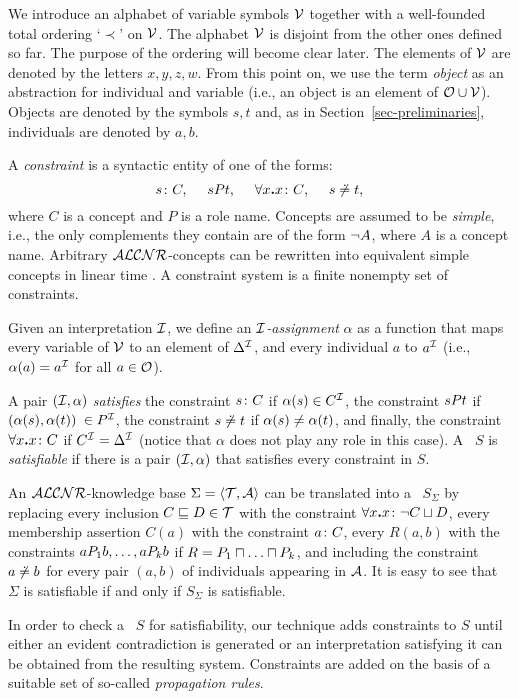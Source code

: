 We introduce an alphabet of variable symbols ${\cal V}$ together
with a well-founded total ordering `$\prec$' on ${\cal V}$.
The alphabet ${\cal V}$ is disjoint from the other ones defined so far.
The purpose of the ordering will become clear later.
The elements of ${\cal V}$ are denoted by the letters
$x,y,z,w$. From this point on, we use the 
term {\em object} as an abstraction for
individual and variable (i.e.,  an object is an element of ${\cal O} \cup {\cal V}$). 
Objects are denoted by the symbols $s,t$ and, as in Section~\ref{sec-preliminaries},
individuals are denoted by $a,b$.

A {\em constraint} is a syntactic entity of one of the 
forms:
	$$s\colon C,~~~~ sPt,~~~~ \forall x\mbox{\bf .}{x\colon C},~~~~ {s \not\doteq t},$$
\noindent
where $C$ is a concept and $P$ is a role name.
Concepts are assumed to be {\em simple}, 
i.e., the only complements they  contain are
of the form $\neg A$, where $A$ is a concept name. Arbitrary 
${\cal ALCNR}$-concepts can be rewritten into equivalent simple
concepts in linear time \cite{DLNN91}.
A constraint system is a finite nonempty set of constraints. 

Given an interpretation ${\cal I}$, we define an 
{\em ${\cal I}$-assignment} $\alpha$ as a function that maps every variable 
of ${\cal V}$ to an element of $\Delta^{\cal I}$, and every 
individual $a$ to $a^{\cal I}$ (i.e., $\alpha(a) = a^{\cal I}$ for all $a \in {\cal O}$).

A pair $({\cal I},\alpha)$ {\em satisfies} the constraint $s\colon C$  
if $\alpha(s) \in C^{\cal I}$, the constraint $sPt$  if 
$(\alpha(s), \alpha(t))$ $\in P^{\cal I}$, the constraint ${s \not\doteq t}$
if $\alpha(s)\neq \alpha(t)$, and finally, the constraint $\forall x\mbox{\bf .}{x\colon C}$ if $C^{\cal I} = \Delta^{\cal I}$
(notice that $\alpha$ does not play any role in this case). 
A \cs\  $S$ is {\em satisfiable} if there is
a pair $({\cal I},\alpha)$ that satisfies every  constraint in $S$.

An ${\cal ALCNR}$-knowledge base $\Sigma = \langle{\cal T},{\cal A} \rangle$ can be translated into a 
\cs\ $S_\Sigma$ by replacing every inclusion $C \sqsubseteq D \in {\cal T}$ with the constraint 
$\forall x\mbox{\bf .}{x\colon\neg C \sqcup D}$, every membership assertion
$C(a)$ with the constraint $a\colon C$, every $R(a,b)$ with the constraints
$aP_1b , \ldots , aP_kb$ if $R= P_1\sqcap\ldots\sqcap P_k$,
and including the constraint ${a \not\doteq b}$ for every pair $(a,b)$ of individuals
appearing in ${\cal A}$.
It is easy to see that $\Sigma$ is satisfiable if and only if $S_\Sigma$ is
satisfiable.

In order to check a \cs\ $S$ for satisfiability, our technique adds
constraints to $S$ until either an evident contradiction is generated or an
interpretation satisfying it can be obtained from the resulting system.
Constraints are added on the basis of a suitable set of so-called {\em
propagation rules}.
 
